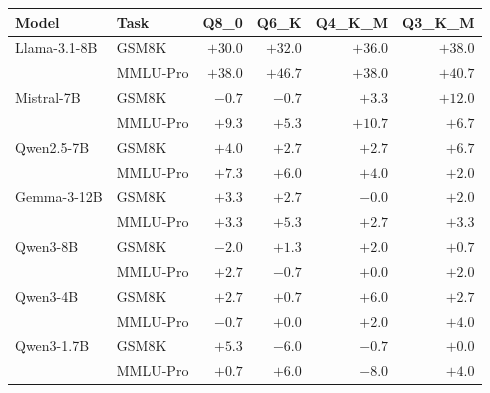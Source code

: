 \begin{tabular}{llrrrr}
\toprule
Model & Task & Q8\_0 & Q6\_K & Q4\_K\_M & Q3\_K\_M \\
\midrule
Llama-3.1-8B & GSM8K & $+30.0$ & $+32.0$ & $+36.0$ & $+38.0$ \\
 & MMLU-Pro & $+38.0$ & $+46.7$ & $+38.0$ & $+40.7$ \\
Mistral-7B & GSM8K & $-0.7$ & $-0.7$ & $+3.3$ & $+12.0$ \\
 & MMLU-Pro & $+9.3$ & $+5.3$ & $+10.7$ & $+6.7$ \\
Qwen2.5-7B & GSM8K & $+4.0$ & $+2.7$ & $+2.7$ & $+6.7$ \\
 & MMLU-Pro & $+7.3$ & $+6.0$ & $+4.0$ & $+2.0$ \\
Gemma-3-12B & GSM8K & $+3.3$ & $+2.7$ & $-0.0$ & $+2.0$ \\
 & MMLU-Pro & $+3.3$ & $+5.3$ & $+2.7$ & $+3.3$ \\
Qwen3-8B & GSM8K & $-2.0$ & $+1.3$ & $+2.0$ & $+0.7$ \\
 & MMLU-Pro & $+2.7$ & $-0.7$ & $+0.0$ & $+2.0$ \\
Qwen3-4B & GSM8K & $+2.7$ & $+0.7$ & $+6.0$ & $+2.7$ \\
 & MMLU-Pro & $-0.7$ & $+0.0$ & $+2.0$ & $+4.0$ \\
Qwen3-1.7B & GSM8K & $+5.3$ & $-6.0$ & $-0.7$ & $+0.0$ \\
 & MMLU-Pro & $+0.7$ & $+6.0$ & $-8.0$ & $+4.0$ \\
\bottomrule
\end{tabular}
